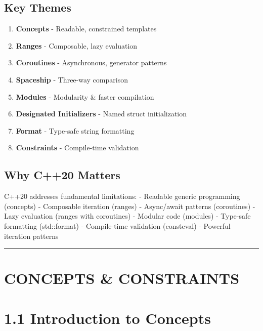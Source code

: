 \hypertarget{key-themes}{%
\subsection{Key Themes}\label{key-themes}}

\begin{enumerate}
\def\labelenumi{\arabic{enumi}.}
\tightlist
\item
  \textbf{Concepts} - Readable, constrained templates
\item
  \textbf{Ranges} - Composable, lazy evaluation
\item
  \textbf{Coroutines} - Asynchronous, generator patterns
\item
  \textbf{Spaceship} - Three-way comparison
\item
  \textbf{Modules} - Modularity \& faster compilation
\item
  \textbf{Designated Initializers} - Named struct initialization
\item
  \textbf{Format} - Type-safe string formatting
\item
  \textbf{Constraints} - Compile-time validation
\end{enumerate}

\hypertarget{why-c20-matters}{%
\subsection{Why C++20 Matters}\label{why-c20-matters}}

C++20 addresses fundamental limitations: - Readable generic programming
(concepts) - Composable iteration (ranges) - Async/await patterns
(coroutines) - Lazy evaluation (ranges with coroutines) - Modular code
(modules) - Type-safe formatting (std::format) - Compile-time validation
(consteval) - Powerful iteration patterns

\begin{center}\rule{0.5\linewidth}{0.5pt}\end{center}

\hypertarget{concepts-constraints}{%
\section{CONCEPTS \& CONSTRAINTS}\label{concepts-constraints}}

\hypertarget{introduction-to-concepts}{%
\section{1.1 Introduction to Concepts}\label{introduction-to-concepts}}

